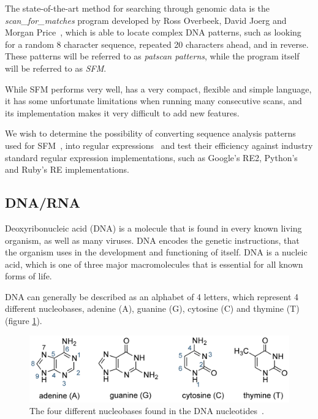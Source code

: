 \documentclass[12pt]{article}
\theoremstyle{definition}
\begin{document}
The state-of-the-art method for searching through genomic data is the \mbox{\emph{scan\_for\_matches}} program developed by Ross Overbeek, David Joerg and Morgan Price~\cite{scan_for_matches}, which is able to locate complex DNA patterns, such as looking for a random 8 character sequence, repeated 20 characters ahead, and in reverse. These patterns will be referred to as \textit{patscan patterns}, while the program itself will be referred to as \textit{SFM}.

While SFM performs very well, has a very compact, flexible and simple language, it has some unfortunate limitations when running many consecutive scans, and its implementation makes it very difficult to add new features.

We wish to determine the possibility of converting sequence analysis patterns used for SFM~\cite{scan_for_matches}, into regular expressions~\cite{crash-course-regex} and test their efficiency against industry standard regular expression implementations, such as Google's RE2, Python's and Ruby's RE implementations.

\subsection{DNA/RNA}

Deoxyribonucleic acid (DNA) is a molecule that is found in every known living organism, as well as many viruses. DNA encodes the genetic instructions, that the organism uses in the development and functioning of itself. DNA is a nucleic acid, which is one of three major macromolecules that is essential for all known forms of life.

DNA can generally be described as an alphabet of 4 letters, which represent 4 different nucleobases, adenine (A), guanine (G), cytosine (C) and thymine (T) (figure \ref{dnabases}).

\begin{figure}[H]
\label{dnabases}
\begin{center}
	\includegraphics[scale=1.3]{DNA-heterocyclic-bases-large.png}
\end{center}
\caption{The four different nucleobases found in the DNA nucleotides~\cite{DNA-biotechacademy}.}
\end{figure}
\end{document}
